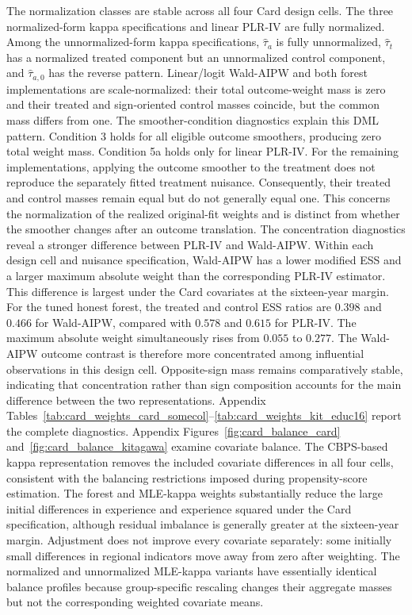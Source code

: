 \documentclass[12pt, a4paper, oneside]{article}
\theoremstyle{plain}
\theoremstyle{definition}
\begin{document}
The normalization classes are stable across all four Card design cells. The three normalized-form kappa specifications and linear PLR-IV are fully normalized. Among the unnormalized-form kappa specifications, \(\widehat\tau_a\) is fully unnormalized, \(\widehat\tau_t\) has a normalized treated component but an unnormalized control component, and \(\widehat\tau_{a,0}\) has the reverse pattern. Linear/logit Wald-AIPW and both forest implementations are scale-normalized: their total outcome-weight mass is zero and their treated and sign-oriented control masses coincide, but the common mass differs from one.
The smoother-condition diagnostics explain this DML pattern. Condition 3 holds for all eligible outcome smoothers, producing zero total weight mass. Condition 5a holds only for linear PLR-IV. For the remaining implementations, applying the outcome smoother to the treatment does not reproduce the separately fitted treatment nuisance. Consequently, their treated and control masses remain equal but do not generally equal one. This concerns the normalization of the realized original-fit weights and is distinct from whether the smoother changes after an outcome translation.
The concentration diagnostics reveal a stronger difference between PLR-IV and Wald-AIPW. Within each design cell and nuisance specification, Wald-AIPW has a lower modified ESS and a larger maximum absolute weight than the corresponding PLR-IV estimator.
This difference is largest under the Card covariates at the sixteen-year margin. For the tuned honest forest, the treated and control ESS ratios are \(0.398\) and \(0.466\) for Wald-AIPW, compared with \(0.578\) and \(0.615\) for PLR-IV. The maximum absolute weight simultaneously rises from \(0.055\) to \(0.277\). The Wald-AIPW outcome contrast is therefore more concentrated among influential observations in this design cell. Opposite-sign mass remains comparatively stable, indicating that concentration rather than sign composition accounts for the main difference between the two representations. Appendix Tables~\ref{tab:card_weights_card_somecol}--\ref{tab:card_weights_kit_educ16} report the complete diagnostics.
Appendix Figures~\ref{fig:card_balance_card} and~\ref{fig:card_balance_kitagawa} examine covariate balance. The CBPS-based kappa representation removes the included covariate differences in all four cells, consistent with the balancing restrictions imposed during propensity-score estimation. The forest and MLE-kappa weights substantially reduce the large initial differences in experience and experience squared under the Card specification, although residual imbalance is generally greater at the sixteen-year margin. Adjustment does not improve every covariate separately: some initially small differences in regional indicators move away from zero after weighting. The normalized and unnormalized MLE-kappa variants have essentially identical balance profiles because group-specific rescaling changes their aggregate masses but not the corresponding weighted covariate means.
\end{document}
